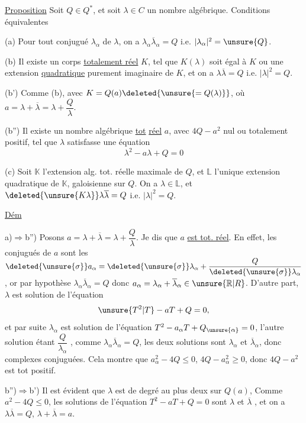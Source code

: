 \uline{Proposition} Soit $Q\in Q^*$, et soit $\lambda\in C$ un nombre algébrique. Conditions équivalentes

(a) Pour tout conjugué $\lambda_\alpha$ de $\lambda$, on a $\lambda_\alpha\overline\lambda_\alpha=Q$ i.e. $|\lambda_\alpha|^2=\unsure{Q}$.

(b)  Il existe un corps  \uline{totalement réel} $K$, tel que  $K(\lambda)$ soit égal à $K$ ou une extension \uline{quadratique} purement imaginaire de $K$, et on a $\lambda\overline\lambda=Q$ i.e. $|\lambda|^2=Q$.

(b') Comme (b), avec $K=Q(a)\deleted{\unsure{=Q(\lambda)}}$, où $a=\lambda+\overline\lambda=\lambda+\dfrac Q\lambda$.

(b'') Il existe un nombre algébrique  \uline{tot} \uline{réel} $a$, avec  $4Q-a^2$ nul ou totalement positif, tel que $\lambda$ satisfasse une équation
\[
\lambda^2-a\lambda+Q=0
\]

(c) Soit $\mathbb K$ l'extension alg. tot. réelle maximale de $Q$, et $\mathbb L$ l'unique extension quadratique de $\mathbb K$, galoisienne sur $Q$. On a $\lambda\in\mathbb L$, et $\deleted{\unsure{K\lambda}}\lambda\overline\lambda=Q$ i.e. $|\lambda|^2=Q$.

\uline{Dém}

a)$\Longrightarrow$b'') Posons $a=\lambda+\overline\lambda=\lambda+\dfrac Q\lambda$. Je dis que $a$ \uline{est tot. réel}. En effet, les conjugués de $a$ sont les $\deleted{\unsure{\sigma}}a_\alpha=\deleted{\unsure{\sigma}}\lambda_\alpha+\dfrac Q{\deleted{\unsure{\sigma}}\lambda_\alpha}$, or par hypothèse $\lambda_\alpha\overline\lambda_\alpha=Q$ donc $a_\alpha=\lambda_\alpha+\overline\lambda_\alpha\in\unsure{\mathbb R|R}$. D'autre part, $\lambda$ est solution de l'équation
\[
\unsure{T^2|T}-aT+Q=0,
\]
et par suite $\lambda_\alpha$ est solution de l'équation $T^2-a_\alpha T+Q_{\unsure{\alpha}}=0$,  l'autre solution étant $\dfrac Q{\lambda_\alpha}$ ,  comme $\lambda_\alpha\overline\lambda_\alpha=Q$, les deux solutions sont $\lambda_\alpha$ et $\overline\lambda_\alpha$, donc complexes conjuguées. Cela montre que $a_\alpha^2-4Q\le0$,   $4Q-a_\alpha^2\ge0$, donc $4Q-a^2$ est tot positif.

b'')$\Longrightarrow$b') Il est évident que $\lambda$ est de degré au plus deux sur  $Q(a)$,     Comme $a^2-4Q\le0$, les solutions de l'équation $T^2-aT+Q=0$ sont $\lambda$ et $\overline\lambda$ , et on a $\lambda\overline\lambda=Q$, $\lambda+\overline\lambda=a$.
